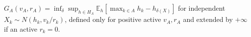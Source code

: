 \(G_A(v_A,r_A)=\inf_\delta\sup_{h\in H_A}\mathbb E_h[\max_{k\in A}h_k-h_{\delta(X)}]\) for independent \(X_k\sim N(h_k,v_k/r_k)\), defined only for positive active \(v_A,r_A\) and extended by \(+\infty\) if an active \(r_k=0\).